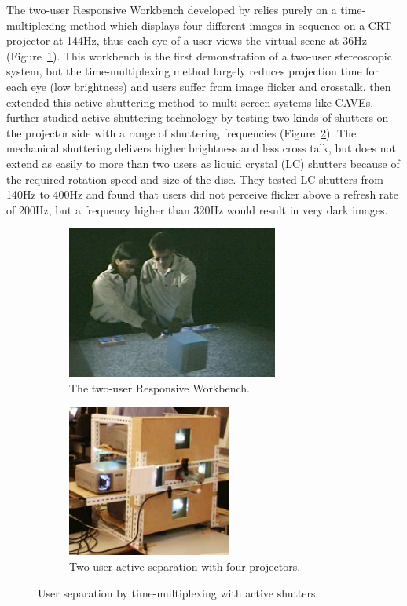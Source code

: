 The two-user Responsive Workbench developed by \citet{Agrawala1997TRW} relies purely on a time-multiplexing method which displays four different images in sequence on a CRT projector at 144Hz, thus each eye of a user views the virtual scene at 36Hz (Figure~\ref{fig:2_sep_active:wb}). This workbench is the first demonstration of a two-user stereoscopic system, but the time-multiplexing method largely reduces projection time for each eye (low brightness) and users suffer from image flicker and crosstalk. \citet{Blom2002Multiple} then extended this active shuttering method to multi-screen systems like CAVEs. \citep{Froehlich2004Implementing} further studied active shuttering technology by testing two kinds of shutters on the projector side with a range of shuttering frequencies (Figure~\ref{fig:2_sep_active:four}). The mechanical shuttering delivers higher brightness and less cross talk, but does not extend as easily to more than two users as liquid crystal (LC) shutters because of the required rotation speed and size of the disc. They tested LC shutters from 140Hz to 400Hz and found that users did not perceive flicker above a refresh rate of 200Hz, but a frequency higher than 320Hz would result in very dark images.

\begin{figure}[htb]
  \begin{subfigure}{.5\textwidth}
    \centering
    \includegraphics[height=5cm]{figures/ch2/resp_workbench}
    \caption{The two-user Responsive Workbench.}
    \label{fig:2_sep_active:wb}
  \end{subfigure}
  \begin{subfigure}{.5\textwidth}
    \centering
    \includegraphics[height=5cm]{figures/ch2/four_proj}
    \caption{Two-user active separation with four projectors.}
    \label{fig:2_sep_active:four}
  \end{subfigure}
  \caption{\label{fig:2_sep_active}User separation by time-multiplexing with active shutters.}
\end{figure}

